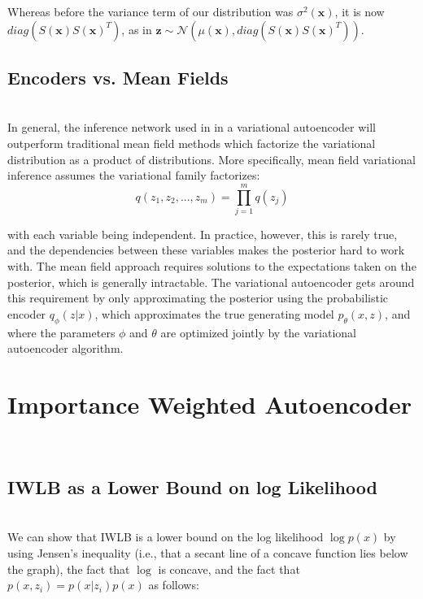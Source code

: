 \documentclass{amsart}
\numberwithin{equation}{section}
\theoremstyle{definition}
\theoremstyle{remark}
\begin{document}
Whereas before the variance term of our distribution was 
$\sigma^2(\bm{x})$, it is now $diag \left(S(\bm{x}) S(\bm{x})^T\right)$, as in 
$\bm z \sim \mathcal{N}(\mu(\bm{x}), diag \left(S(\bm{x}) S(\bm{x})^T\right) )$.\\

\subsection{Encoders vs. Mean Fields} \\

In general, the inference network used in in a variational autoencoder will 
outperform traditional mean field methods which factorize the variational
distribution as a product of distributions. More specifically, mean field 
variational inference assumes the variational family factorizes: \\

$$ q(z_1, z_2, ..., z_m) = \prod_{j=1}^m q(z_j) $$

with each variable being independent. In practice, however, this is rarely true,
and the dependencies between these variables makes the posterior hard to work 
with. The mean field approach requires solutions to the expectations taken on 
the posterior, which is generally  intractable. The variational autoencoder gets 
around this requirement by only approximating the posterior using the 
probabilistic encoder $ q_{\phi}(z|x) $, which approximates the true generating
model $ p_{\theta}(x,z) $, and where the parameters $\phi$ and $\theta$ are 
optimized jointly by the variational autoencoder algorithm.

\section{Importance Weighted Autoencoder} \\

\subsection{IWLB as a Lower Bound on log Likelihood} \\

We can show that IWLB is a lower bound on the log likelihood $\log p(x)$ by 
using Jensen's inequality (i.e., that a secant line of a concave function 
lies below the graph), the fact that $\log$ is concave, and the fact that 
$p(x,z_i)= p(x|z_i)p(x)$ as follows: \\
\end{document}
